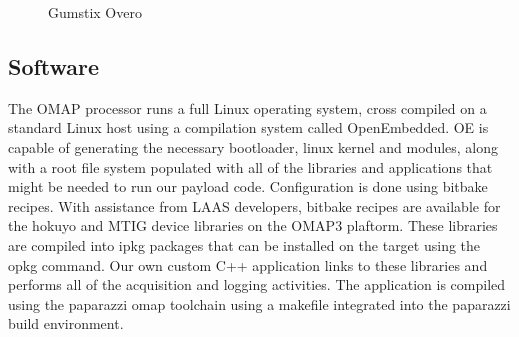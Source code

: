 \documentclass[a4paper,11pt]{report}
\begin{document}
\begin{figure}[htb]
  \centering
  \caption{Gumstix Overo}
  \label{fig:overo}
\end{figure}


\subsection{Software}

The OMAP processor runs a full Linux operating system, cross compiled on a standard Linux host using a compilation system called OpenEmbedded. OE is capable of generating the necessary bootloader, linux kernel and modules, along with a root file system populated with all of the libraries and applications that might be needed to run our payload code. Configuration is done using bitbake recipes. With assistance from LAAS developers, bitbake recipes are available for the hokuyo and MTIG device libraries on the OMAP3 plaftorm. These libraries are compiled into ipkg packages that can be installed on the target using the opkg command. Our own custom C++ application links to these libraries and performs all of the acquisition and logging activities. The application is compiled using the paparazzi omap toolchain using a makefile integrated into the paparazzi build environment.
\end{document}
